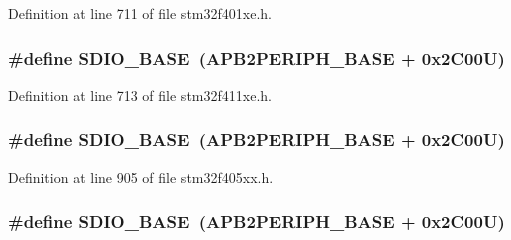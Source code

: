 Definition at line 711 of file stm32f401xe.\+h.

\subsubsection[{\texorpdfstring{S\+D\+I\+O\+\_\+\+B\+A\+SE}{SDIO_BASE}}]{\setlength{\rightskip}{0pt plus 5cm}\#define S\+D\+I\+O\+\_\+\+B\+A\+SE~({\bf A\+P\+B2\+P\+E\+R\+I\+P\+H\+\_\+\+B\+A\+SE} + 0x2\+C00\+U)}\hypertarget{group___peripheral__registers__structures_ga95dd0abbc6767893b4b02935fa846f52}{}\label{group___peripheral__registers__structures_ga95dd0abbc6767893b4b02935fa846f52}


Definition at line 713 of file stm32f411xe.\+h.

\subsubsection[{\texorpdfstring{S\+D\+I\+O\+\_\+\+B\+A\+SE}{SDIO_BASE}}]{\setlength{\rightskip}{0pt plus 5cm}\#define S\+D\+I\+O\+\_\+\+B\+A\+SE~({\bf A\+P\+B2\+P\+E\+R\+I\+P\+H\+\_\+\+B\+A\+SE} + 0x2\+C00\+U)}\hypertarget{group___peripheral__registers__structures_ga95dd0abbc6767893b4b02935fa846f52}{}\label{group___peripheral__registers__structures_ga95dd0abbc6767893b4b02935fa846f52}


Definition at line 905 of file stm32f405xx.\+h.

\subsubsection[{\texorpdfstring{S\+D\+I\+O\+\_\+\+B\+A\+SE}{SDIO_BASE}}]{\setlength{\rightskip}{0pt plus 5cm}\#define S\+D\+I\+O\+\_\+\+B\+A\+SE~({\bf A\+P\+B2\+P\+E\+R\+I\+P\+H\+\_\+\+B\+A\+SE} + 0x2\+C00\+U)}\hypertarget{group___peripheral__registers__structures_ga95dd0abbc6767893b4b02935fa846f52}{}\label{group___peripheral__registers__structures_ga95dd0abbc6767893b4b02935fa846f52}


